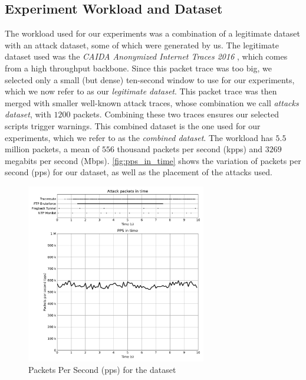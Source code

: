 \subsection{Experiment Workload and Dataset} %

The workload used for our experiments was a combination of a legitimate dataset with an attack dataset, some of which were generated by us. The legitimate dataset used was the \textit{CAIDA Anonymized Internet Traces 2016} \cite{CAIDA2016}, which comes from a high throughput backbone. Since this packet trace was too big, we selected only a small (but dense) ten-second window to use for our experiments, which we now refer to as our \textit{legitimate dataset}. This packet trace was then merged with smaller well-known attack traces, whose combination we call \textit{attacks dataset}, with $1200$ packets. Combining these two traces ensures our selected scripts trigger warnings. This combined dataset is the one used for our experiments, which we refer to as the \textit{combined dataset}. The workload has $5.5$ million packets, a mean of $556$ thousand packets per second (kpps) and $3269$ megabits per second (Mbps). \autoref{fig:pps_in_time} shows the variation of packets per second (pps) for our dataset, as well as the placement of the attacks used.

\begin{figure}[htb]
    \caption{Packets Per Second (pps) for the dataset}
    \begin{center}
        \includegraphics[width=0.7\textwidth]{images/pps_in_time.pdf}  
    \end{center}
    \label{fig:pps_in_time}
\end{figure}

